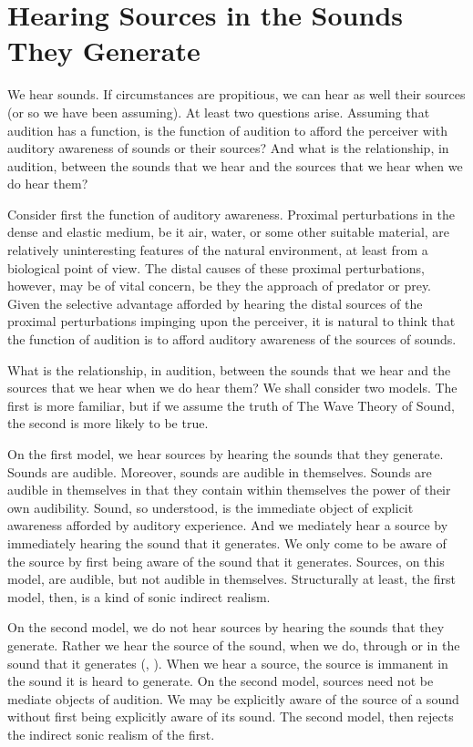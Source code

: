 \documentclass[12pt]{article}
\begin{document}

\section{Hearing Sources in the Sounds They Generate} %
\label{sec:hearing_sources_in_the_sounds_they_generate}

We hear sounds. If circumstances are propitious, we can hear as well their sources (or so we have been assuming). At least two questions arise. Assuming that audition has a function, is the function of audition to afford the perceiver with auditory awareness of sounds or their sources? And what is the relationship, in audition, between the sounds that we hear and the sources that we hear when we do hear them?

Consider first the function of auditory awareness. Proximal perturbations in the dense and elastic medium, be it air, water, or some other suitable material, are relatively uninteresting features of the natural environment, at least from a biological point of view. The distal causes of these proximal perturbations, however, may be of vital concern, be they the approach of predator or prey. Given the selective advantage afforded by hearing the distal sources of the proximal perturbations impinging upon the perceiver, it is natural to think that the function of audition is to afford auditory awareness of the sources of sounds.

What is the relationship, in audition, between the sounds that we hear and the sources that we hear when we do hear them? We shall consider two models. The first is more familiar, but if we assume the truth of The Wave Theory of Sound, the second is more likely to be true. 

On the first model, we hear sources by hearing the sounds that they generate. Sounds are audible. Moreover, sounds are audible in themselves. Sounds are audible in themselves in that they contain within themselves the power of their own audibility. Sound, so understood, is the immediate object of explicit awareness afforded by auditory experience. And we mediately hear a source by immediately hearing the sound that it generates. We only come to be aware of the source by first being aware of the sound that it generates. Sources, on this model, are audible, but not audible in themselves. Structurally at least, the first model, then, is a kind of sonic indirect realism.

On the second model, we do not hear sources by hearing the sounds that they generate. Rather we hear the source of the sound, when we do, through or in the sound that it generates (\citealt{Leddington:2014aa}, \citealt[chapter 4]{Kalderon:2018oe}). When we hear a source, the source is immanent in the sound it is heard to generate. On the second model, sources need not be mediate objects of audition. We may be explicitly aware of the source of a sound without first being explicitly aware of its sound. The second model, then rejects the indirect sonic realism of the first.
\end{document}
